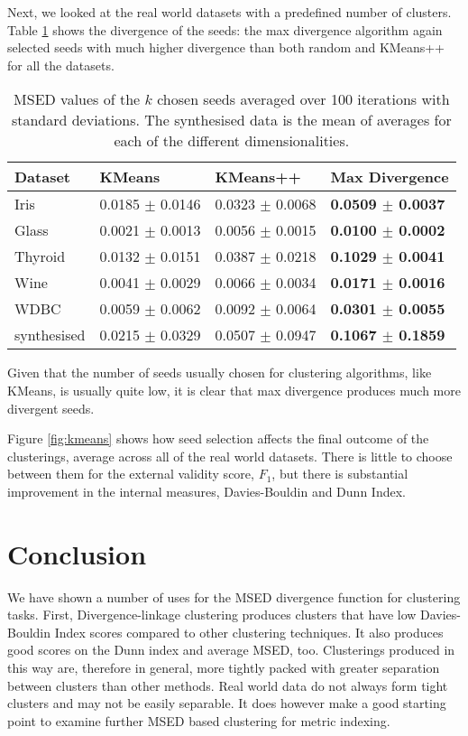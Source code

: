Next, we looked at the real world datasets with a predefined number of clusters.  Table \ref{tab:cluster_validation} shows the divergence of the seeds: the max divergence algorithm again selected seeds with much higher divergence than both random and KMeans++ for all the datasets.
\begin{table}
\caption{
MSED values of the $k$ chosen seeds averaged over 100 iterations with standard deviations.  The synthesised data is the mean of averages for each of the different dimensionalities.
}\label{tab:cluster_validation}
\begin{tabularx}{\textwidth}{Xl|l|l}
\hline
Dataset			&KMeans						&KMeans++					& Max Divergence\\ 
\hline
Iris				&0.0185	$\pm$ 0.0146	&0.0323 	$\pm$ 0.0068		&\textbf{0.0509 $\pm$ 0.0037}\\
Glass			&0.0021	$\pm$ 0.0013	&0.0056	$\pm$ 0.0015		&\textbf{0.0100 $\pm$ 0.0002}\\
Thyroid			&0.0132	$\pm$ 0.0151	&0.0387	$\pm$ 0.0218		&\textbf{0.1029 $\pm$ 0.0041}\\
Wine				&0.0041	$\pm$ 0.0029	&0.0066	$\pm$ 0.0034		&\textbf{0.0171 $\pm$ 0.0016}\\
WDBC				&0.0059	$\pm$ 0.0062	&0.0092	$\pm$ 0.0064		&\textbf{0.0301 $\pm$ 0.0055}\\
\hline
synthesised		&0.0215 $\pm$ 0.0329	&0.0507 $\pm$ 0.0947		&\textbf{0.1067 $\pm$ 0.1859}\\
\hline
\end{tabularx}
\end{table}

Given that the number of seeds usually chosen for clustering algorithms, like KMeans, is usually quite low, it is clear that max divergence produces much more divergent seeds.

Figure \ref{fig:kmeans} shows how seed selection affects the final outcome of the clusterings, average across all of the real world datasets. There is little to choose between them for the external validity score, $F_1$, but there is substantial improvement in the internal measures, Davies-Bouldin and Dunn Index.   

\section{Conclusion}
We have shown a number of uses for the MSED divergence function for clustering tasks.  First, Divergence-linkage clustering produces clusters that have low Davies-Bouldin Index scores compared to other clustering techniques. It also produces good scores on the Dunn index and average MSED, too.  Clusterings produced in this way are, therefore in general, more tightly packed with greater separation between clusters than other methods.    Real world data do not always form tight clusters and may not be easily separable.  It does however make a good starting point to examine further MSED based clustering for metric indexing.


